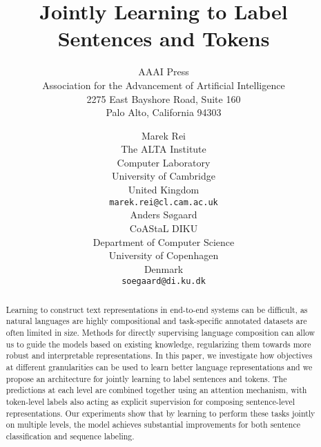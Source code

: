 \documentclass[letterpaper]{article} \usepackage{aaai19}  \usepackage{times}  \usepackage{helvet}  \usepackage{courier}  \usepackage{graphicx}
\begin{document}
\title{Jointly Learning to Label Sentences and Tokens}


\author{AAAI Press\\
Association for the Advancement of Artificial Intelligence\\
2275 East Bayshore Road, Suite 160\\
Palo Alto, California 94303\\
}
\author{Marek Rei \\
 The ALTA Institute \\
 Computer Laboratory \\
 University of Cambridge \\
 United Kingdom\\
 {\tt marek.rei@cl.cam.ac.uk} \\\And
 Anders S{\o}gaard \\
 CoAStaL DIKU\\
 Department of Computer Science\\
 University of Copenhagen\\
 Denmark \\
 {\tt soegaard@di.ku.dk} \\}

\maketitle
\begin{abstract}
Learning to construct text representations in end-to-end systems can be difficult, as natural languages are highly compositional and task-specific annotated datasets are often limited in size.
Methods for directly supervising language composition can allow us to guide the models based on existing knowledge, regularizing them towards more robust and interpretable representations.
In this paper, we investigate how objectives at different granularities can be used to learn better language representations and we propose an architecture for jointly learning to label sentences and tokens.
The predictions at each level are combined together using an attention mechanism, with token-level labels also acting as explicit supervision for composing sentence-level representations.
Our experiments show that by learning to perform these tasks jointly on multiple levels, the model achieves substantial improvements for both sentence classification and sequence labeling.





\end{abstract}
\end{document}
